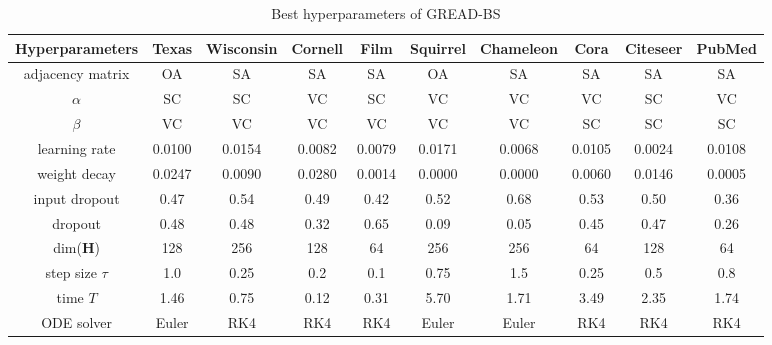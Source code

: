 \documentclass{article}
\theoremstyle{plain}
\theoremstyle{definition}
\theoremstyle{remark}
\begin{document}
\begin{table*}[ht!]
    \centering
    \small
    \caption{Best hyperparameters of GREAD-BS}
    \label{tab:best_BS}
    \begin{tabular}{c ccccccccc} \toprule
        Hyperparameters  & Texas  & Wisconsin 
                                           & Cornell& Film   & Squirrel 
                                                                      & Chameleon
                                                                               & Cora   & Citeseer 
                                                                                                 & PubMed\\ \midrule
        adjacency matrix & OA     & SA     & SA     & SA     & OA     & SA     & SA     & SA     & SA    \\
        $\alpha$         & SC     & SC     & VC     & SC     & VC     & VC     & VC     & SC     & VC    \\
        $\beta$          & VC     & VC     & VC     & VC     & VC     & VC     & SC     & SC     & SC    \\
        learning rate    & 0.0100 & 0.0154 & 0.0082 & 0.0079 & 0.0171 & 0.0068 & 0.0105 & 0.0024 & 0.0108\\
        weight decay     & 0.0247 & 0.0090 & 0.0280 & 0.0014 & 0.0000 & 0.0000 & 0.0060 & 0.0146 & 0.0005\\
        input dropout    & 0.47   & 0.54   & 0.49   & 0.42   & 0.52   & 0.68   & 0.53   & 0.50   & 0.36  \\
        dropout          & 0.48   & 0.48   & 0.32   & 0.65   & 0.09   & 0.05   & 0.45   & 0.47   & 0.26  \\
        dim($\mathbf{H}$)& 128    & 256    & 128    & 64     & 256    & 256    & 64     & 128    & 64    \\
        step size $\tau$ & 1.0    & 0.25   & 0.2    & 0.1    & 0.75   & 1.5    & 0.25   & 0.5    & 0.8   \\
        time $T$         & 1.46   & 0.75   & 0.12   & 0.31   & 5.70   & 1.71   & 3.49   & 2.35   & 1.74  \\
        ODE solver       & Euler  & RK4    & RK4    & RK4    & Euler  & Euler  & RK4    & RK4    & RK4  \\
        \bottomrule
    \end{tabular}
\end{table*}
\end{document}

